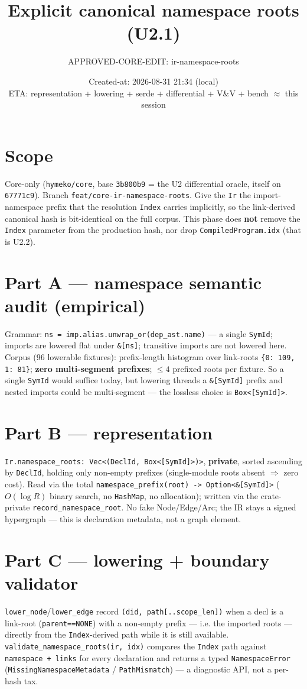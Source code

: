 \documentclass[11pt]{article}
\title{Explicit canonical namespace roots (U2.1)}
\author{APPROVED-CORE-EDIT: ir-namespace-roots}
\date{Created-at: 2026-08-31 21:34 (local) \\ ETA: representation + lowering + serde + differential + V\&V + bench $\approx$ this session}
\begin{document}
\maketitle

\section*{Scope}
Core-only (\texttt{hymeko/core}, base \texttt{3b800b9} = the U2 differential
oracle, itself on \texttt{67771c9}). Branch \texttt{feat/core-ir-namespace-roots}.
Give the \texttt{Ir} the import-namespace prefix that the resolution \texttt{Index}
carries implicitly, so the link-derived canonical hash is bit-identical on the
full corpus. This phase does \textbf{not} remove the \texttt{Index} parameter from
the production hash, nor drop \texttt{CompiledProgram.idx} (that is U2.2).

\section*{Part A --- namespace semantic audit (empirical)}
Grammar: \texttt{ns = imp.alias.unwrap\_or(dep\_ast.name)} --- a single
\texttt{SymId}; imports are lowered flat under \texttt{\&[ns]}; transitive imports
are not lowered here. Corpus (96 lowerable fixtures): prefix-length histogram over
link-roots \texttt{\{0: 109, 1: 81\}}; \textbf{zero multi-segment prefixes};
$\leq 4$ prefixed roots per fixture. So a single \texttt{SymId} would suffice
today, but lowering threads a \texttt{\&[SymId]} prefix and nested imports could
be multi-segment --- the lossless choice is \texttt{Box<[SymId]>}.

\section*{Part B --- representation}
\texttt{Ir.namespace\_roots: Vec<(DeclId, Box<[SymId]>)>}, \textbf{private},
sorted ascending by \texttt{DeclId}, holding only non-empty prefixes
(single-module roots absent $\Rightarrow$ zero cost). Read via the total
\texttt{namespace\_prefix(root) -> Option<\&[SymId]>} ($O(\log R)$ binary search,
no \texttt{HashMap}, no allocation); written via the crate-private
\texttt{record\_namespace\_root}. No fake Node/Edge/Arc; the IR stays a signed
hypergraph --- this is declaration metadata, not a graph element.

\section*{Part C --- lowering + boundary validator}
\texttt{lower\_node}/\texttt{lower\_edge} record \texttt{(did, path[..scope\_len])}
when a decl is a link-root (\texttt{parent==NONE}) with a non-empty prefix ---
i.e. the imported roots --- directly from the \texttt{Index}-derived path while it
is still available. \texttt{validate\_namespace\_roots(ir, idx)} compares the
\texttt{Index} path against \texttt{namespace\,+\,links} for every declaration and
returns a typed \texttt{NamespaceError} (\texttt{MissingNamespaceMetadata} /
\texttt{PathMismatch}) --- a diagnostic API, not a per-hash tax.
\end{document}
